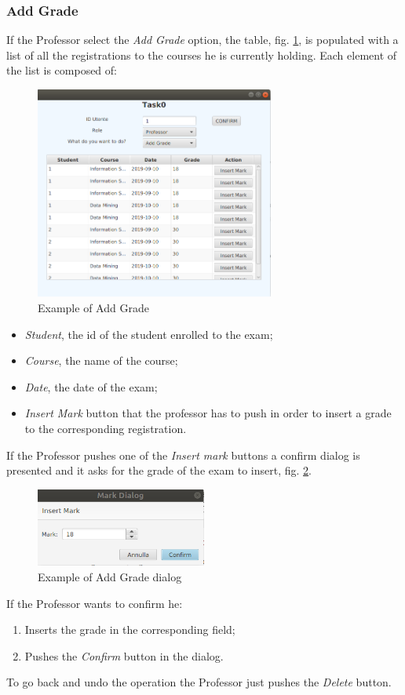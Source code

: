 \documentclass{report}
\begin{document}
\subsubsection*{Add Grade}
If the Professor select the \textit{Add Grade} option, the table, fig. \ref{fig:AddGrade}, is populated with a list of all the registrations to the courses he is currently holding. Each element of the list is composed of:
\begin{figure} [h!]
	\centering
	\includegraphics[width=0.7\textwidth]{AddGrade.png}
	\caption{Example of Add Grade}
	\label{fig:AddGrade}
\end{figure}
\begin{itemize}
	\item \textit{Student}, the id of the student enrolled to the exam;
	\item \textit{Course}, the name of the course;
	\item \textit{Date}, the date of the exam;
	\item \textit{Insert Mark} button that the professor has to push in order to insert a grade to the corresponding registration. 
\end{itemize}
If the Professor pushes one of the \textit{Insert mark} buttons a confirm dialog is presented and it asks for the grade of the exam to insert, fig. \ref{fig:AddGradeDialog}.
\begin{figure} [h!]
	\centering
	\includegraphics[width=0.5\textwidth]{AddGradeDialog.png}
	\caption{Example of Add Grade dialog}
	\label{fig:AddGradeDialog}
\end{figure}
If the Professor wants to confirm he:
\begin{enumerate}
	\item Inserts the grade in the corresponding field;
	\item Pushes the \textit{Confirm} button in the dialog.
\end{enumerate}
To go back and undo the operation the Professor just pushes the \textit{Delete} button.
\end{document}

